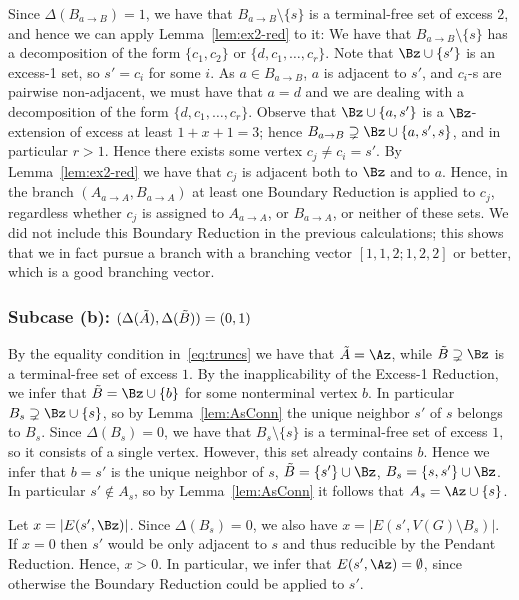 Since $\Delta(B_{a\to B})=1$, we have that $B_{a\to B}\setminus \{s\}$ is a terminal-free set of excess $2$, and hence we can apply Lemma~\ref{lem:ex2-red} to it: We have that $B_{a\to B}\setminus \{s\}$ has a decomposition of the form $\{c_1,c_2\}$ or $\{d,c_1,\ldots,c_r\}$. Note that $\Bz\cup \{s'\}$ is an excess-1 set, so $s'=c_i$ for some $i$. As $a\in B_{a\to B}$, $a$ is adjacent to $s'$, and $c_i$-s are pairwise non-adjacent, we must have that $a=d$ and we are dealing with a decomposition of the form $\{d,c_1,\ldots,c_r\}$. Observe that $\Bz\cup \{a,s'\}$ is a $\Bz$-extension of excess at least $1+x+1=3$; hence $B_{a\to B}\supsetneq \Bz \cup \{a,s',s\}$, and in particular $r>1$. Hence there exists some vertex $c_j\neq c_i=s'$. By Lemma~\ref{lem:ex2-red} we have that $c_j$ is adjacent both to $\Bz$ and to $a$. Hence, in the branch $(A_{a\to A},B_{a\to A})$ at least one Boundary Reduction is applied to $c_j$, regardless whether $c_j$ is assigned to $A_{a\to A}$, or $B_{a\to A}$, or neither of these sets. We did not include this Boundary Reduction in the previous calculations; this shows that we in fact pursue a branch with a branching vector $[1,1,2;1,2,2]$ or better, which is a good branching vector.









\subsubsection{Subcase (b): $(\Delta(\tilde{A}),\Delta(\tilde{B}))=(0,1)$}

By the equality condition in~\eqref{eq:truncs} we have that $\Atr=\Az$, while $\Btr\supsetneq \Bz$ is a terminal-free set of excess $1$. By the inapplicability of the Excess-1 Reduction, we infer that $\Btr=\Bz\cup \{b\}$ for some nonterminal vertex $b$. In particular $B_s\supsetneq\Bz\cup \{s\}$, so by Lemma~\ref{lem:AsConn} the unique neighbor $s'$ of $s$ belongs to $B_s$. Since $\Delta(B_s)=0$, we have that $B_s\setminus \{s\}$ is a terminal-free set of excess $1$, so it consists of a single vertex. However, this set already contains $b$. Hence we infer that $b=s'$ is the unique neighbor of $s$, $\Btr=\{s'\}\cup \Bz$, $B_s=\{s,s'\}\cup \Bz$. In particular $s'\notin A_s$, so by Lemma~\ref{lem:AsConn} it follows that $A_s=\Az \cup \{s\}$.

Let $x=|E(s',\Bz)|$. Since $\Delta(B_s)=0$, we also have $x=|E(s',V(G)\setminus B_s)|$. If $x=0$ then $s'$ would be only adjacent to $s$ and thus reducible by the Pendant Reduction. Hence, $x>0$. In particular, we infer that $E(s',\Az)=\emptyset$, since otherwise the Boundary Reduction could be applied to $s'$.















